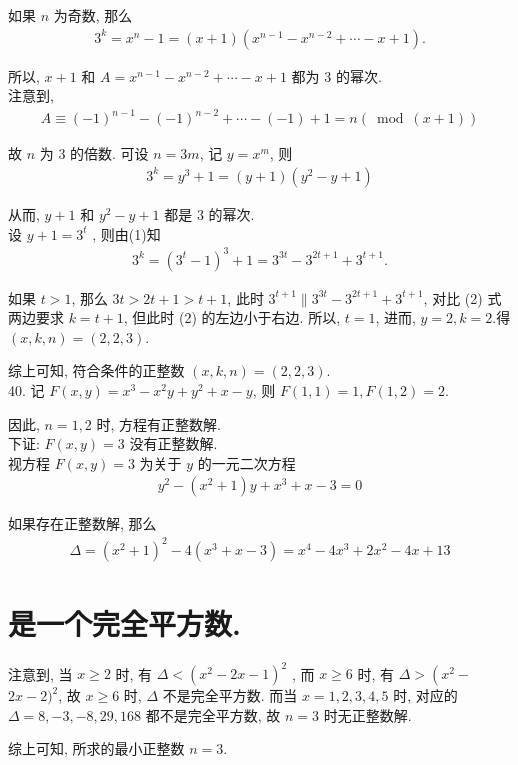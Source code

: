 如果 $n$ 为奇数, 那么
\begin{align*}
	3^{k}=x^{n}-1=(x+1)\left(x^{n-1}-x^{n-2}+\cdots-x+1\right) .
\end{align*}

所以,  $x+1$ 和 $A=x^{n-1}-x^{n-2}+\cdots-x+1$ 都为 3 的幂次. \\
注意到,
\begin{align*}
	A \equiv(-1)^{n-1}-(-1)^{n-2}+\cdots-(-1)+1=n(\bmod (x+1))
\end{align*}

故 $n$ 为 3 的倍数. 可设 $n=3 m$, 记 $y=x^{m}$, 则
\begin{align*}
	3^{k}=y^{3}+1=(y+1)\left(y^{2}-y+1\right)
\end{align*}

从而, $y+1$ 和 $y^{2}-y+1$ 都是 3 的幂次.\\
设 $y+1=3^{t}$ , 则由(1)知
\begin{align*}
	3^{k}=\left(3^{t}-1\right)^{3}+1=3^{3 t}-3^{2 t+1}+3^{t+1} .
\end{align*}

如果 $t>1$, 那么 $3 t>2 t+1>t+1$, 此时 $3^{t+1} \| 3^{3 t}-3^{2 t+1}+3^{t+1}$, 对比 (2) 式两边要求 $k=t+1$, 但此时 (2) 的左边小于右边. 所以, $t=1$, 进而, $y=2, k=2$.得 $(x, k, n)=(2,2,3)$.

综上可知, 符合条件的正整数 $(x, k, n)=(2,2,3)$.\\
40. 记 $F(x, y)=x^{3}-x^{2} y+y^{2}+x-y$, 则 $F(1,1)=1, F(1,2)=2$.

因此, $n=1,2$ 时, 方程有正整数解.\\
下证:  $F(x, y)=3$ 没有正整数解. \\
视方程 $F(x, y)=3$ 为关于 $y$ 的一元二次方程
\begin{align*}
	y^{2}-\left(x^{2}+1\right) y+x^{3}+x-3=0
\end{align*}

如果存在正整数解, 那么
\begin{align*}
	\Delta=\left(x^{2}+1\right)^{2}-4\left(x^{3}+x-3\right)=x^{4}-4 x^{3}+2 x^{2}-4 x+13
\end{align*}

\section{是一个完全平方数.}
注意到, 当 $x \geqslant 2$ 时, 有 $\Delta<\left(x^{2}-2 x-1\right)^{2}$ , 而 $x \geqslant 6$ 时, 有 $\Delta>\left(x^{2}-\right.$ $2 x-2)^{2}$, 故 $x \geqslant 6$ 时, $\Delta$ 不是完全平方数. 而当 $x=1,2,3,4,5$ 时, 对应的 $\Delta=8,-3,-8,29,168$ 都不是完全平方数, 故 $n=3$ 时无正整数解.

综上可知, 所求的最小正整数 $n=3$.






